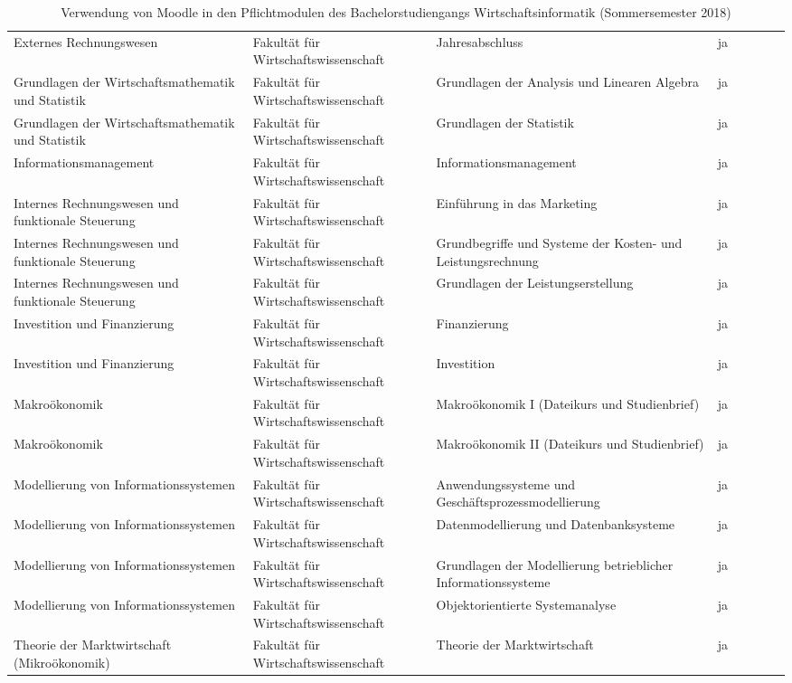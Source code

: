 \begin{sidewaystable}
{\begin{tabular}{lllrrrrr}
Externes Rechnungswesen & Fakultät für Wirtschaftswissenschaft & Jahresabschluss & ja\\
Grundlagen der Wirtschaftsmathematik und Statistik & Fakultät für Wirtschaftswissenschaft & Grundlagen der Analysis und Linearen Algebra & ja\\
Grundlagen der Wirtschaftsmathematik und Statistik & Fakultät für Wirtschaftswissenschaft & Grundlagen der Statistik & ja\\
Informationsmanagement & Fakultät für Wirtschaftswissenschaft & Informationsmanagement & ja\\
Internes Rechnungswesen und funktionale Steuerung & Fakultät für Wirtschaftswissenschaft & Einführung in das Marketing & ja\\
Internes Rechnungswesen und funktionale Steuerung & Fakultät für Wirtschaftswissenschaft & Grundbegriffe und Systeme der Kosten- und Leistungsrechnung & ja\\
Internes Rechnungswesen und funktionale Steuerung & Fakultät für Wirtschaftswissenschaft & Grundlagen der Leistungserstellung & ja\\
Investition und Finanzierung & Fakultät für Wirtschaftswissenschaft & Finanzierung & ja\\
Investition und Finanzierung & Fakultät für Wirtschaftswissenschaft & Investition & ja\\
Makroökonomik & Fakultät für Wirtschaftswissenschaft & Makroökonomik I (Dateikurs und Studienbrief) & ja\\
Makroökonomik & Fakultät für Wirtschaftswissenschaft & Makroökonomik II (Dateikurs und Studienbrief) & ja\\
Modellierung von Informationssystemen & Fakultät für Wirtschaftswissenschaft & Anwendungssysteme und Geschäftsprozessmodellierung & ja\\
Modellierung von Informationssystemen & Fakultät für Wirtschaftswissenschaft & Datenmodellierung und Datenbanksysteme & ja\\
Modellierung von Informationssystemen & Fakultät für Wirtschaftswissenschaft & Grundlagen der Modellierung betrieblicher Informationssysteme & ja\\
Modellierung von Informationssystemen & Fakultät für Wirtschaftswissenschaft & Objektorientierte Systemanalyse & ja\\
Theorie der Marktwirtschaft (Mikroökonomik) & Fakultät für Wirtschaftswissenschaft & Theorie der Marktwirtschaft & ja\\

\end{tabular}}
\caption{Verwendung von Moodle in den Pflichtmodulen des Bachelorstudiengangs Wirtschaftsinformatik (Sommersemester 2018)}
\label{tab:VerwendungVonMoodle}
\end{sidewaystable}

